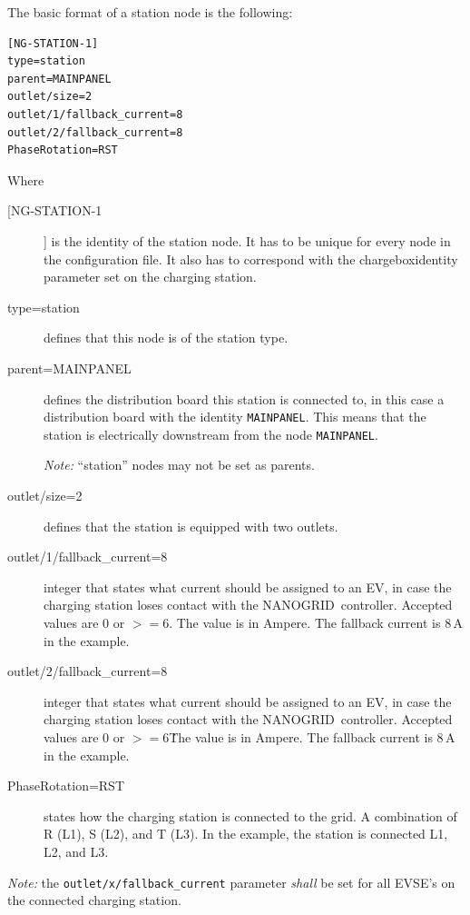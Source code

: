 \documentclass[10pt,a4paper,oneside,headings=big,headsepline]{scrreprt}
\newcommand{\nanogrid}{NANOGRID\texttrademark}
\begin{document}
The basic format of a station node is the following:

\begin{verbatim}
[NG-STATION-1]
type=station
parent=MAINPANEL
outlet/size=2
outlet/1/fallback_current=8
outlet/2/fallback_current=8
PhaseRotation=RST
\end{verbatim}

Where

\begin{description}
\item [[NG-STATION-1]] is the identity of the station node. It has to be
  unique for every node in the configuration file. It also has to correspond
  with the chargeboxidentity parameter set on the charging station.

\item [type=station] defines that this node is of the station type.

\item [parent=MAINPANEL] defines the distribution board this station is
  connected to, in this case a distribution board with the identity
  \verb|MAINPANEL|. This means that the station is electrically downstream from
  the node \verb|MAINPANEL|.

  \emph{Note:} ``station'' nodes may not be set as parents.

\item[outlet/size=2] defines that the station is equipped with two outlets.

\item[outlet/1/fallback\_current=8] integer that states what current should be
  assigned to an EV, in case the charging station loses contact with the
  \nanogrid\ controller. Accepted values are 0 or $>= 6$. The value is in
  Ampere. The fallback current is 8\,A in the example.


\item[outlet/2/fallback\_current=8] integer that states what current should be
  assigned to an EV, in case the charging station loses contact with the
  \nanogrid\ controller. Accepted values are 0 or $>= 6$\. The value is in
  Ampere.  The fallback current is 8\,A in the example.

\item[PhaseRotation=RST] states how the charging station is connected to the
  grid. A combination of R (L1), S (L2), and T (L3). In the example, the
  station is connected L1, L2, and L3.
\end{description}

\emph{Note:} the \verb|outlet/x/fallback_current| parameter \emph{shall} be
set for all EVSE's on the connected charging station.
\end{document}
